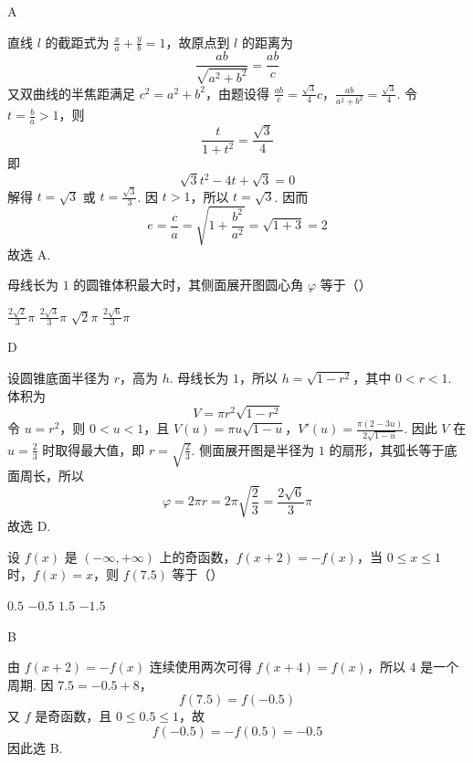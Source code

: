 \begin{answer}
A
\end{answer}

\begin{solution}
直线 \(l\) 的截距式为 \(\frac{x}{a}+\frac{y}{b}=1\)，故原点到 \(l\) 的距离为
\[
\frac{ab}{\sqrt{a^2+b^2}}=\frac{ab}{c}
\]
又双曲线的半焦距满足 \(c^2=a^2+b^2\)，由题设得
\(\frac{ab}{c}=\frac{\sqrt3}{4}c\)，\(\frac{ab}{a^2+b^2}=\frac{\sqrt3}{4}\).
令 \(t=\frac{b}{a}>1\)，则
\[
\frac{t}{1+t^2}=\frac{\sqrt3}{4}
\]
即
\[
\sqrt3t^2-4t+\sqrt3=0
\]
解得 \(t=\sqrt3\) 或 \(t=\frac{\sqrt3}{3}\). 因 \(t>1\)，所以 \(t=\sqrt3\). 因而
\[
e=\frac ca=\sqrt{1+\frac{b^2}{a^2}}=\sqrt{1+3}=2
\]
故选 A.
\end{solution}

\begin{problem}
母线长为 \(1\) 的圆锥体积最大时，其侧面展开图圆心角 \(\varphi\) 等于（\quad）

\choices
    {\(\frac{2\sqrt{2}}{3}\pi\)}
    {\(\frac{2\sqrt{3}}{3}\pi\)}
    {\(\sqrt{2}\pi\)}
    {\(\frac{2\sqrt{6}}{3}\pi\)}
\end{problem}

\begin{answer}
D
\end{answer}

\begin{solution}
设圆锥底面半径为 \(r\)，高为 \(h\). 母线长为 \(1\)，所以 \(h=\sqrt{1-r^2}\)，其中 \(0<r<1\). 体积为
\[
V=\pi r^2\sqrt{1-r^2}
\]
令 \(u=r^2\)，则 \(0<u<1\)，且
\(V(u)=\pi u\sqrt{1-u}\)，\(V'(u)=\frac{\pi(2-3u)}{2\sqrt{1-u}}\).
因此 \(V\) 在 \(u=\frac23\) 时取得最大值，即 \(r=\sqrt{\frac23}\). 侧面展开图是半径为 \(1\) 的扇形，其弧长等于底面周长，所以
\[
\varphi=2\pi r=2\pi\sqrt{\frac23}=\frac{2\sqrt6}{3}\pi
\]
故选 D.
\end{solution}

\begin{problem}
设 \(f(x) \) 是 \((- \infty, + \infty)\) 上的奇函数，\(f(x + 2) = -f(x) \)，当 \(0 \leqslant x \leqslant 1 \) 时，\(f(x) = x\)，则 \(f(7.5)\) 等于（\quad）

\choices
    {\(0.5\)}
    {\(-0.5\)}
    {\(1.5\)}
    {\(-1.5\)}
\end{problem}

\begin{answer}
B
\end{answer}

\begin{solution}
由 \(f(x+2)=-f(x)\) 连续使用两次可得 \(f(x+4)=f(x)\)，所以 \(4\) 是一个周期. 因 \(7.5=-0.5+8\)，
\[
f(7.5)=f(-0.5)
\]
又 \(f\) 是奇函数，且 \(0\leqslant0.5\leqslant1\)，故
\[
f(-0.5)=-f(0.5)=-0.5
\]
因此选 B.
\end{solution}

